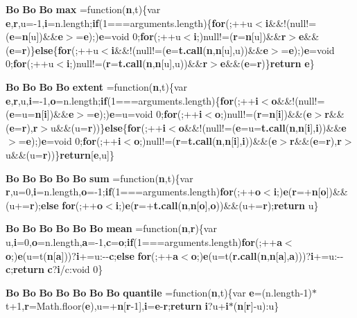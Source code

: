 \begin{DoxyCompactItemize}
\item 
{\bf Bo} {\bf Bo} {\bf Bo} {\bf max} =function({\bf n},t)\{var {\bf e},{\bf r},u=-\/1,{\bf i}=n.\+length;{\bf if}(1===arguments.\+length)\{{\bf for}(;++u$<${\bf i}\&\&!(null!=({\bf e}={\bf n}[u])\&\&{\bf e}$>$={\bf e});){\bf e}=void 0;{\bf for}(;++u$<${\bf i};)null!=({\bf r}={\bf n}[u])\&\&{\bf r}$>${\bf e}\&\&({\bf e}={\bf r})\}{\bf else}\{{\bf for}(;++u$<${\bf i}\&\&!(null!=({\bf e}={\bf t.\+call}({\bf n},{\bf n}[u],u))\&\&{\bf e}$>$={\bf e});){\bf e}=void 0;{\bf for}(;++u$<${\bf i};)null!=({\bf r}={\bf t.\+call}({\bf n},{\bf n}[u],u))\&\&{\bf r}$>${\bf e}\&\&({\bf e}={\bf r})\}{\bf return} {\bf e}\}
\item 
{\bf Bo} {\bf Bo} {\bf Bo} {\bf Bo} {\bf extent} =function({\bf n},t)\{var {\bf e},{\bf r},u,{\bf i}=-\/1,{\bf o}=n.\+length;{\bf if}(1===arguments.\+length)\{{\bf for}(;++{\bf i}$<${\bf o}\&\&!(null!=({\bf e}=u={\bf n}[{\bf i}])\&\&{\bf e}$>$={\bf e});){\bf e}=u=void 0;{\bf for}(;++{\bf i}$<${\bf o};)null!=({\bf r}={\bf n}[{\bf i}])\&\&({\bf e}$>${\bf r}\&\&({\bf e}={\bf r}),{\bf r}$>$u\&\&(u={\bf r}))\}{\bf else}\{{\bf for}(;++{\bf i}$<${\bf o}\&\&!(null!=({\bf e}=u={\bf t.\+call}({\bf n},{\bf n}[{\bf i}],{\bf i}))\&\&{\bf e}$>$={\bf e});){\bf e}=void 0;{\bf for}(;++{\bf i}$<${\bf o};)null!=({\bf r}={\bf t.\+call}({\bf n},{\bf n}[{\bf i}],{\bf i}))\&\&({\bf e}$>${\bf r}\&\&({\bf e}={\bf r}),{\bf r}$>$u\&\&(u={\bf r}))\}{\bf return}[{\bf e},u]\}
\item 
{\bf Bo} {\bf Bo} {\bf Bo} {\bf Bo} {\bf Bo} {\bf sum} =function({\bf n},t)\{var {\bf r},u=0,{\bf i}=n.\+length,{\bf o}=-\/1;{\bf if}(1===arguments.\+length){\bf for}(;++{\bf o}$<${\bf i};){\bf e}({\bf r}=+{\bf n}[{\bf o}])\&\&(u+={\bf r});{\bf else} {\bf for}(;++{\bf o}$<${\bf i};){\bf e}({\bf r}=+{\bf t.\+call}({\bf n},{\bf n}[{\bf o}],{\bf o}))\&\&(u+={\bf r});{\bf return} u\}
\item 
{\bf Bo} {\bf Bo} {\bf Bo} {\bf Bo} {\bf Bo} {\bf Bo} {\bf mean} =function({\bf n},{\bf r})\{var u,{\bf i}=0,{\bf o}=n.\+length,{\bf a}=-\/1,{\bf c}={\bf o};{\bf if}(1===arguments.\+length){\bf for}(;++{\bf a}$<${\bf o};){\bf e}(u=t({\bf n}[{\bf a}]))?{\bf i}+=u\+:-\/-\/{\bf c};{\bf else} {\bf for}(;++{\bf a}$<${\bf o};){\bf e}(u=t({\bf r.\+call}({\bf n},{\bf n}[{\bf a}],{\bf a})))?{\bf i}+=u\+:-\/-\/{\bf c};{\bf return} {\bf c}?{\bf i}/c\+:void 0\}
\item 
{\bf Bo} {\bf Bo} {\bf Bo} {\bf Bo} {\bf Bo} {\bf Bo} {\bf Bo} {\bf quantile} =function({\bf n},t)\{var {\bf e}=(n.\+length-\/1)$\ast$t+1,{\bf r}=Math.\+floor({\bf e}),u=+{\bf n}[{\bf r}-\/1],{\bf i}={\bf e}-\/{\bf r};{\bf return} {\bf i}?u+{\bf i}$\ast$({\bf n}[{\bf r}]-\/u)\+:u\}

\end{DoxyCompactItemize}

